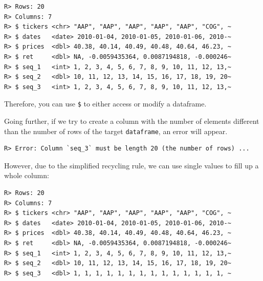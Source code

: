 \documentclass[
  12pt,
]{book}
\newenvironment{Shaded}{\begin{snugshade}}{\end{snugshade}}
\newcommand{\DataTypeTok}[1]{\textcolor[rgb]{0.27,0.27,0.27}{#1}}
\newcommand{\DecValTok}[1]{\textcolor[rgb]{0.06,0.06,0.06}{#1}}
\newcommand{\KeywordTok}[1]{\textcolor[rgb]{0.27,0.27,0.27}{\textbf{#1}}}
\newcommand{\NormalTok}[1]{#1}
\newcommand{\OperatorTok}[1]{\textcolor[rgb]{0.43,0.43,0.43}{\textbf{#1}}}
\newcommand{\StringTok}[1]{\textcolor[rgb]{0.5,0.5,0.5}{#1}}
\begin{document}
\begin{verbatim}
R> Rows: 20
R> Columns: 7
R> $ tickers <chr> "AAP", "AAP", "AAP", "AAP", "AAP", "COG", ~
R> $ dates   <date> 2010-01-04, 2010-01-05, 2010-01-06, 2010-~
R> $ prices  <dbl> 40.38, 40.14, 40.49, 40.48, 40.64, 46.23, ~
R> $ ret     <dbl> NA, -0.0059435364, 0.0087194818, -0.000246~
R> $ seq_1   <int> 1, 2, 3, 4, 5, 6, 7, 8, 9, 10, 11, 12, 13,~
R> $ seq_2   <dbl> 10, 11, 12, 13, 14, 15, 16, 17, 18, 19, 20~
R> $ seq_3   <int> 1, 2, 3, 4, 5, 6, 7, 8, 9, 10, 11, 12, 13,~
\end{verbatim}

Therefore, you can use \texttt{\$} to either access or modify a dataframe.

Going further, if we try to create a column with the number of elements different than the number of rows of the target \texttt{dataframe}, an error will appear.

\begin{Shaded}
\end{Shaded}

\begin{verbatim}
R> Error: Column `seq_3` must be length 20 (the number of rows) ...
\end{verbatim}

However, due to the simplified recycling rule, we can use single values to fill up a whole column:

\begin{Shaded}
\end{Shaded}

\begin{verbatim}
R> Rows: 20
R> Columns: 7
R> $ tickers <chr> "AAP", "AAP", "AAP", "AAP", "AAP", "COG", ~
R> $ dates   <date> 2010-01-04, 2010-01-05, 2010-01-06, 2010-~
R> $ prices  <dbl> 40.38, 40.14, 40.49, 40.48, 40.64, 46.23, ~
R> $ ret     <dbl> NA, -0.0059435364, 0.0087194818, -0.000246~
R> $ seq_1   <int> 1, 2, 3, 4, 5, 6, 7, 8, 9, 10, 11, 12, 13,~
R> $ seq_2   <dbl> 10, 11, 12, 13, 14, 15, 16, 17, 18, 19, 20~
R> $ seq_3   <dbl> 1, 1, 1, 1, 1, 1, 1, 1, 1, 1, 1, 1, 1, 1, ~
\end{verbatim}
\end{document}
